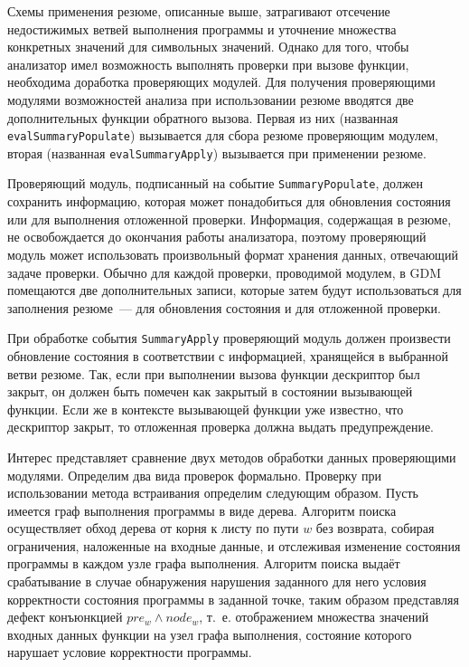 Схемы применения резюме, описанные выше, затрагивают отсечение недостижимых ветвей выполнения программы и уточнение множества конкретных значений для символьных значений. Однако для того, чтобы анализатор имел возможность выполнять проверки при вызове функции, необходима доработка проверяющих модулей. Для получения проверяющими модулями возможностей анализа при использовании резюме вводятся две дополнительных функции обратного вызова. Первая из них (названная \texttt{evalSummaryPopulate}) вызывается для сбора резюме проверяющим модулем, вторая (названная \texttt{evalSummaryApply}) вызывается при применении резюме.

Проверяющий модуль, подписанный на событие \texttt{SummaryPopulate}, должен сохранить информацию, которая может понадобиться для обновления состояния или для выполнения отложенной проверки. Информация, содержащая в резюме, не освобождается до окончания работы анализатора, поэтому проверяющий модуль может использовать произвольный формат хранения данных, отвечающий задаче проверки. Обычно для каждой проверки, проводимой модулем, в GDM помещаются две дополнительных записи, которые затем будут использоваться для заполнения резюме~--- для обновления состояния и для отложенной проверки.

При обработке события \texttt{SummaryApply} проверяющий модуль должен произвести обновление состояния в соответствии с информацией, хранящейся в выбранной ветви резюме. Так, если при выполнении вызова функции дескриптор был закрыт, он должен быть помечен как закрытый в состоянии вызывающей функции. Если же в контексте вызывающей функции уже известно, что дескриптор закрыт, то отложенная проверка должна выдать предупреждение.

Интерес представляет сравнение двух методов обработки данных проверяющими модулями. Определим два вида проверок формально. Проверку при использовании метода встраивания определим следующим образом. Пусть имеется граф выполнения программы в виде дерева. Алгоритм поиска осуществляет обход дерева от корня к листу по пути $w$ без возврата, собирая ограничения, наложенные на входные данные, и отслеживая изменение состояния программы в каждом узле графа выполнения. Алгоритм поиска выдаёт срабатывание в случае обнаружения нарушения заданного для него условия корректности состояния программы в заданной точке, таким образом представляя дефект конъюнкцией $pre_w \wedge node_w$, т.~е. отображением множества значений входных данных функции на узел графа выполнения, состояние которого нарушает условие корректности программы.

